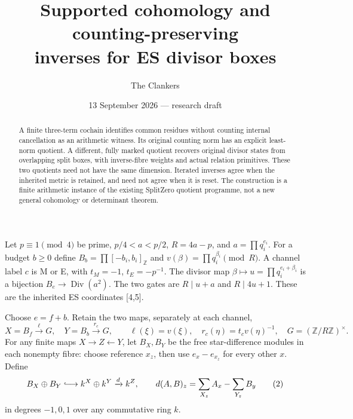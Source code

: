 \documentclass[11pt,a4paper]{article}
\title{Supported cohomology and counting-preserving\texorpdfstring{\\}{} inverses for ES divisor boxes}
\author{The Clankers}
\date{13 September 2026 --- research draft}
\begin{document}
\maketitle
\begin{abstract}
A finite three-term cochain identifies common residues without counting
internal cancellation as an arithmetic witness. Its original counting
norm has an explicit least-norm quotient. A different, fully marked
quotient recovers original divisor states from overlapping split boxes,
with inverse-fibre weights and actual relation primitives. These two
quotients need not have the same dimension. Iterated inverses agree when
the inherited metric is retained, and need not agree when it is reset.
The construction is a finite arithmetic instance of the existing SplitZero
quotient programme, not a new general cohomology or determinant theorem.
\end{abstract}

Let $p\equiv1\pmod4$ be prime, $p/4<a<p/2$, $R=4a-p$, and
$a=\prod q_i^{e_i}$. For a budget $b\ge0$ define
$B_b=\prod[-b_i,b_i]_{\mathbb Z}$ and
$v(\beta)=\prod q_i^{\beta_i}\pmod R$.
A channel label $c$ is M or E, with $t_M=-1$, $t_E=-p^{-1}$.
The divisor map $\beta\mapsto u=\prod q_i^{e_i+\beta_i}$ is a bijection
$B_e\to\operatorname{Div}(a^2)$. The two gates are $R\mid u+a$ and
$R\mid4u+1$. These are the inherited ES coordinates [4,5].

Choose $e=f+b$. Retain the two maps, separately at each channel,
\[
 X=B_f\xrightarrow{\ell}G,\quad Y=B_b\xrightarrow{r_c}G,
 \qquad\ell(\xi)=v(\xi),\quad r_c(\eta)=t_cv(\eta)^{-1},
 \quad G=(\mathbb Z/R\mathbb Z)^\times.                       \tag{1}
\]
For any finite maps $X\to Z\leftarrow Y$, let $B_X,B_Y$ be the free
star-difference modules in each nonempty fibre: choose reference $x_z$,
then use $e_x-e_{x_z}$ for every other $x$. Define
\[
 B_X\oplus B_Y\lhook\joinrel\longrightarrow k^X\oplus k^Y
 \xrightarrow{d}k^Z,
 \qquad d(A,B)_z=\sum_{X_z}A_x-\sum_{Y_z}B_y               \tag{2}
\]
in degrees $-1,0,1$ over any commutative ring $k$.
\end{document}
